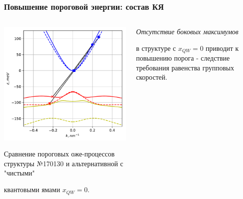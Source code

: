 \documentclass[9pt,pdf]{beamer}
\begin{document}
    \begin{frame}
        \frametitle{Повышение пороговой энергии: состав КЯ}
        \begin{columns}
            \begin{column}{0.7\textwidth}
                \begin{center}
                    \includegraphics[width=1\textwidth]{images/18um_p_vs_i.pdf}
                \end{center}
                Сравнение пороговых оже-процессов структуры №170130
                и альтернативной с "чистыми" 
                
                квантовыми ямами $x_{QW} = 0$.
            \end{column}
            \hfill
            \begin{column}{0.3\textwidth}
                \textit{Отсутствие боковых максимумов} 
                
                в структуре с $x_{QW} = 0$
                приводит к повышению порога - следствие требования равенства 
                групповых скоростей.

                \vspace{3.5cm}
            \end{column}
        \end{columns}
    \end{frame}
\end{document}
